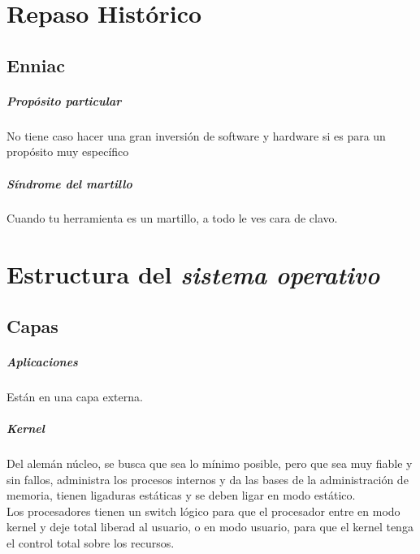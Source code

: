 \newpage

\chapter{Repaso Hist\'{o}rico}
\section{Enniac}
\paragraph{Prop\'{o}sito particular} No tiene caso hacer una gran inversi\'{o}n de software y hardware si es para un prop\'{o}sito muy espec\'{i}fico\\

\paragraph{S\'{i}ndrome del martillo} Cuando tu herramienta es un martillo, a todo le ves cara de clavo.

\newpage

\chapter{Estructura del \textit{sistema operativo}}

\section{Capas}
\paragraph{Aplicaciones} Est\'{a}n en una capa externa. \\

\paragraph{Kernel} Del alem\'{a}n n\'{u}cleo, se busca que sea lo m\'{i}nimo posible, pero que sea muy fiable y sin fallos, administra los procesos internos y da las bases de la administraci\'{o}n de memoria, tienen ligaduras est\'{a}ticas y se deben ligar en modo est\'{a}tico.\\
Los procesadores tienen un switch l\'{o}gico para que el procesador entre en modo kernel y deje total liberad al usuario, o en modo usuario, para que el kernel tenga el control total sobre los recursos. \\

